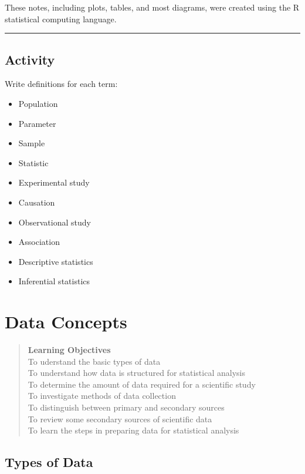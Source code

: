 \documentclass[
]{book}
\providecommand{\tightlist}{%
  \setlength{\itemsep}{0pt}\setlength{\parskip}{0pt}}
\begin{document}
These notes, including plots, tables, and most diagrams, were created using the R statistical computing language.

\begin{center}\rule{0.5\linewidth}{0.5pt}\end{center}

\section{Activity}\label{activity}

Write definitions for each term:

\begin{itemize}
\tightlist
\item
  Population
\item
  Parameter
\item
  Sample
\item
  Statistic
\item
  Experimental study
\item
  Causation
\item
  Observational study
\item
  Association
\item
  Descriptive statistics
\item
  Inferential statistics
\end{itemize}

\chapter{Data Concepts}\label{data_concepts}

\begin{quote}
\textbf{Learning Objectives}\\
To uderstand the basic types of data\\
To understand how data is structured for statistical analysis\\
To determine the amount of data required for a scientific study\\
To investigate methods of data collection\\
To distinguish between primary and secondary sources\\
To review some secondary sources of scientific data\\
To learn the steps in preparing data for statistical analysis
\end{quote}

\section{Types of Data}\label{types-of-data}
\end{document}
